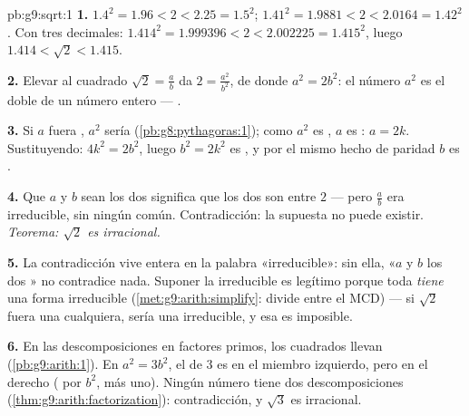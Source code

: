 \begin{solution}{pb:g9:sqrt:1}
\textbf{1.} $1.4^2 = 1.96 < 2 < 2.25 = 1.5^2$;
$1.41^2 = 1.9881 < 2 < 2.0164 = 1.42^2$. Con tres decimales:
$1.414^2 = 1.999396 < 2 < 2.002225 = 1.415^2$, luego
$1.414 < \sqrt2 < 1.415$.

\textbf{2.} Elevar al cuadrado $\sqrt2 = \frac ab$ da
$2 = \frac{a^2}{b^2}$, de donde $a^2 = 2b^2$: el número $a^2$ es
el doble de un número entero --- \emph{}.

\textbf{3.} Si $a$ fuera , $a^2$ sería 
(\cref{pb:g8:pythagoras:1}); como $a^2$ es , $a$ es :
$a = 2k$. Sustituyendo: $4k^2 = 2b^2$, luego $b^2 = 2k^2$ es ,
y por el mismo hecho de paridad $b$ es .

\textbf{4.} Que $a$ y $b$ sean los dos  significa que los dos son  entre $2$
--- pero $\frac ab$ era irreducible, sin ningún 
común. Contradicción: la  supuesta no puede existir.
\emph{Teorema: $\sqrt2$ es irracional.}

\textbf{5.} La contradicción vive entera en la palabra
«irreducible»: sin ella, «$a$ y $b$ los dos » no contradice
nada. Suponer la  irreducible es legítimo porque toda
 \emph{tiene} una forma irreducible
(\cref{met:g9:arith:simplify}: divide entre el MCD) --- si
$\sqrt2$ fuera una  cualquiera, sería una  irreducible,
y esa es imposible.

\textbf{6.} En las descomposiciones en factores primos, los cuadrados llevan 
 (\cref{pb:g9:arith:1}). En $a^2 = 3b^2$, el 
de $3$ es  en el miembro izquierdo, pero  en el derecho ( por
$b^2$, más uno). Ningún número tiene dos descomposiciones
(\cref{thm:g9:arith:factorization}): contradicción, y
$\sqrt3$ es irracional.


\end{solution}
